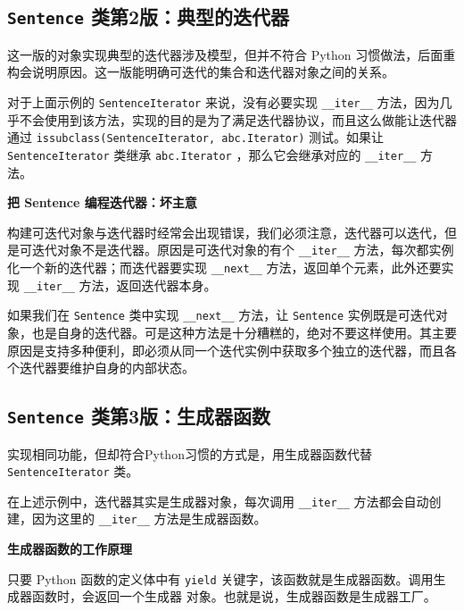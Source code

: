 \subsection{\texttt{Sentence} 类第2版：典型的迭代器}

这一版的对象实现典型的迭代器涉及模型，但并不符合 Python 习惯做法，后面重构会说明原因。这一版能明确可迭代的集合和迭代器对象之间的关系。



对于上面示例的 \texttt{SentenceIterator} 来说，没有必要实现 \texttt{\_\_iter\_\_} 方法，因为几乎不会使用到该方法，实现的目的是为了满足迭代器协议，而且这么做能让迭代器通过 \texttt{issubclass(SentenceIterator, abc.Iterator)} 测试。如果让 \texttt{SentenceIterator} 类继承 \texttt{abc.Iterator} ，那么它会继承对应的 \texttt{\_\_iter\_\_} 方法。

\noindent\textbf{把 Sentence 编程迭代器：坏主意}

构建可迭代对象与迭代器时经常会出现错误，我们必须注意，迭代器可以迭代，但是可迭代对象不是迭代器。原因是可迭代对象的有个 \texttt{\_\_iter\_\_} 方法，每次都实例化一个新的迭代器；而迭代器要实现 \texttt{\_\_next\_\_} 方法，返回单个元素，此外还要实现 \texttt{\_\_iter\_\_} 方法，返回迭代器本身。

如果我们在 \texttt{Sentence} 类中实现 \texttt{\_\_next\_\_} 方法，让 \texttt{Sentence} 实例既是可迭代对象，也是自身的迭代器。可是这种方法是十分糟糕的，绝对不要这样使用。其主要原因是支持多种便利，即必须从同一个迭代实例中获取多个独立的迭代器，而且各个迭代器要维护自身的内部状态。

\subsection{\texttt{Sentence} 类第3版：生成器函数}

实现相同功能，但却符合Python习惯的方式是，用生成器函数代替 \texttt{SentenceIterator} 类。



在上述示例中，迭代器其实是生成器对象，每次调用 \texttt{\_\_iter\_\_} 方法都会自动创建，因为这里的 \texttt{\_\_iter\_\_} 方法是生成器函数。

\noindent\textbf{生成器函数的工作原理}

只要 Python 函数的定义体中有 \texttt{yield} 关键字，该函数就是生成器函数。调用生成器函数时，会返回一个生成器 对象。也就是说，生成器函数是生成器工厂。

